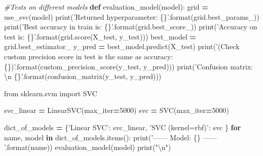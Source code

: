 \documentclass[10pt,a4paper]{article}
\newenvironment{Shaded}{\begin{snugshade}}{\end{snugshade}}
\newcommand{\BuiltInTok}[1]{#1}
\newcommand{\CharTok}[1]{\textcolor[rgb]{0.31,0.60,0.02}{#1}}
\newcommand{\CommentTok}[1]{\textcolor[rgb]{0.56,0.35,0.01}{\textit{#1}}}
\newcommand{\ControlFlowTok}[1]{\textcolor[rgb]{0.13,0.29,0.53}{\textbf{#1}}}
\newcommand{\DecValTok}[1]{\textcolor[rgb]{0.00,0.00,0.81}{#1}}
\newcommand{\ImportTok}[1]{#1}
\newcommand{\KeywordTok}[1]{\textcolor[rgb]{0.13,0.29,0.53}{\textbf{#1}}}
\newcommand{\NormalTok}[1]{#1}
\newcommand{\OperatorTok}[1]{\textcolor[rgb]{0.81,0.36,0.00}{\textbf{#1}}}
\newcommand{\SpecialCharTok}[1]{\textcolor[rgb]{0.00,0.00,0.00}{#1}}
\newcommand{\StringTok}[1]{\textcolor[rgb]{0.31,0.60,0.02}{#1}}
\theoremstyle{break}
\begin{document}
\begin{Shaded}
\begin{Highlighting}[]
\CommentTok{#Tests on different models}
\KeywordTok{def}\NormalTok{ evaluation_model(model):}
\NormalTok{    grid }\OperatorTok{=}\NormalTok{ use_svc(model)}
    \BuiltInTok{print}\NormalTok{(}\StringTok{'Returned hyperparameter: }\SpecialCharTok{\{\}}\StringTok{'}\NormalTok{.}\BuiltInTok{format}\NormalTok{(grid.best_params_))}
    \BuiltInTok{print}\NormalTok{(}\StringTok{'Best accuracy in train is: }\SpecialCharTok{\{\}}\StringTok{'}\NormalTok{.}\BuiltInTok{format}\NormalTok{(grid.best_score_))}
    \BuiltInTok{print}\NormalTok{(}\StringTok{'Accuracy on test is: }\SpecialCharTok{\{\}}\StringTok{'}\NormalTok{.}\BuiltInTok{format}\NormalTok{(grid.score(X_test, y_test)))}
\NormalTok{    best_model }\OperatorTok{=}\NormalTok{ grid.best_estimator_}
\NormalTok{    y_pred }\OperatorTok{=}\NormalTok{ best_model.predict(X_test)}
    \BuiltInTok{print}\NormalTok{(}\StringTok{'(Check custom precision score in test is the same as accuracy: }\SpecialCharTok{\{\}}\StringTok{)'}\NormalTok{.}\BuiltInTok{format}\NormalTok{(custom_precision_score(y_test, y_pred)))}
    \BuiltInTok{print}\NormalTok{(}\StringTok{'Confusion matrix: }\CharTok{\textbackslash{}n}\StringTok{ }\SpecialCharTok{\{\}}\StringTok{'}\NormalTok{.}\BuiltInTok{format}\NormalTok{(confusion_matrix(y_test, y_pred)))}
\end{Highlighting}
\end{Shaded}

\begin{Shaded}
\begin{Highlighting}[]
\ImportTok{from}\NormalTok{ sklearn.svm }\ImportTok{import}\NormalTok{ SVC}

\NormalTok{svc_linear }\OperatorTok{=}\NormalTok{ LinearSVC(max_iter}\OperatorTok{=}\DecValTok{5000}\NormalTok{)}
\NormalTok{svc }\OperatorTok{=}\NormalTok{ SVC(max_iter}\OperatorTok{=}\DecValTok{5000}\NormalTok{)}

\NormalTok{dict_of_models }\OperatorTok{=}\NormalTok{ \{}\StringTok{'Linear SVC'}\NormalTok{: svc_linear,}
                  \StringTok{'SVC (kernel=rbf)'}\NormalTok{: svc}
\NormalTok{                  \}}
\ControlFlowTok{for}\NormalTok{ name, model }\KeywordTok{in}\NormalTok{ dict_of_models.items():}
    \BuiltInTok{print}\NormalTok{(}\StringTok{'------ Model: }\SpecialCharTok{\{\}}\StringTok{ ------ '}\NormalTok{.}\BuiltInTok{format}\NormalTok{(name))}
\NormalTok{    evaluation_model(model)}
    \BuiltInTok{print}\NormalTok{(}\StringTok{"}\CharTok{\textbackslash{}n}\StringTok{"}\NormalTok{)}
\end{Highlighting}
\end{Shaded}
\end{document}
